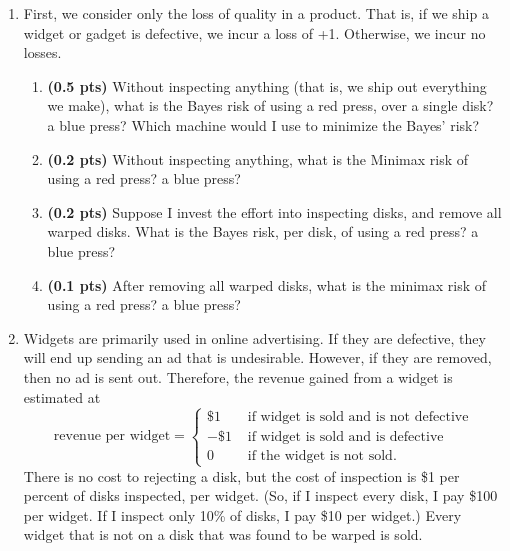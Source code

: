 \documentclass{article}
\newcommand{\showpoints}[1]{\textbf{(#1)}}
\begin{document}
\begin{enumerate}
\begin{enumerate}
\item First, we consider only the loss of quality in a product. That is, if we ship a  widget or gadget is defective, we incur a loss of +1. Otherwise, we incur no losses.

\begin{enumerate}
\item \showpoints{0.5 pts} Without inspecting anything (that is, we ship out everything we make), what is the Bayes risk of using a red press, over a single disk? a blue press? 
Which machine would I use to minimize the Bayes' risk?



\item \showpoints{0.2 pts} Without inspecting anything, what is the Minimax risk of using a red press? a blue press?





\item \showpoints{0.2 pts} Suppose I invest the effort into inspecting disks, and remove all warped disks.
What is the Bayes risk, per disk,  of using a red press? a blue press?



 

\item \showpoints{0.1 pts} After removing all warped disks,  what is the minimax risk of using a red press? a blue press?






\end{enumerate}

\item Widgets are primarily used in online advertising. If they are defective, they will end up sending an ad that is undesirable. However, if they are removed, then no ad is sent out. Therefore, the revenue gained from a widget is estimated at 
\[
\text{revenue per widget} = \begin{cases}
\$1  & \text{ if widget is sold and is not defective}\\
-\$1 & \text{ if widget is sold and is defective}\\
0 & \text{ if the widget is not sold.}
\end{cases}
\]
There is no cost to rejecting a disk, but the cost of inspection is \$1 per percent of disks inspected, per widget. (So, if I inspect every disk, I pay \$100 per widget. If I inspect only 10\% of disks, I pay \$10 per widget.) Every widget that is not on a disk that was found to be warped is sold.


\end{enumerate}
\end{enumerate}
\end{document}
